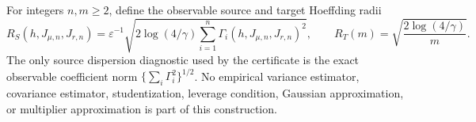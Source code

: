 For integers \(n,m\ge2\), define the observable source and target Hoeffding radii
\[
R_S(h,J_{\mu,n},J_{r,n})
=\varepsilon^{-1}\sqrt{2\log(4/\gamma)\sum_{i=1}^n\Gamma_i(h,J_{\mu,n},J_{r,n})^2},
\qquad
R_T(m)=\sqrt{\frac{2\log(4/\gamma)}{m}}.
\]
The only source dispersion diagnostic used by the certificate is the exact observable coefficient norm \(\{\sum_i\Gamma_i^2\}^{1/2}\). No empirical variance estimator, covariance estimator, studentization, leverage condition, Gaussian approximation, or multiplier approximation is part of this construction.